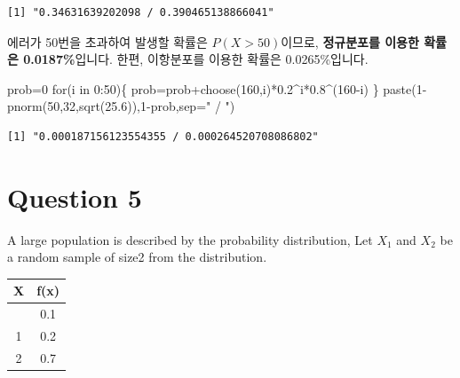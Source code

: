 \documentclass[
  a4paper,
  DIV=11,
  numbers=noendperiod]{scrreprt}
\newenvironment{Shaded}{\begin{snugshade}}{\end{snugshade}}
\newcommand{\AttributeTok}[1]{\textcolor[rgb]{0.40,0.45,0.13}{#1}}
\newcommand{\ControlFlowTok}[1]{\textcolor[rgb]{0.00,0.23,0.31}{#1}}
\newcommand{\DecValTok}[1]{\textcolor[rgb]{0.68,0.00,0.00}{#1}}
\newcommand{\FloatTok}[1]{\textcolor[rgb]{0.68,0.00,0.00}{#1}}
\newcommand{\FunctionTok}[1]{\textcolor[rgb]{0.28,0.35,0.67}{#1}}
\newcommand{\NormalTok}[1]{\textcolor[rgb]{0.00,0.23,0.31}{#1}}
\newcommand{\OtherTok}[1]{\textcolor[rgb]{0.00,0.23,0.31}{#1}}
\newcommand{\SpecialCharTok}[1]{\textcolor[rgb]{0.37,0.37,0.37}{#1}}
\newcommand{\StringTok}[1]{\textcolor[rgb]{0.13,0.47,0.30}{#1}}
\begin{document}
\begin{verbatim}
[1] "0.34631639202098 / 0.390465138866041"
\end{verbatim}

에러가 50번을 초과하여 발생할 확률은 \(P(X>50)\)이므로,
\textbf{정규분포를 이용한 확률은 0.0187\%}입니다. 한편, 이항분포를
이용한 확률은 0.0265\%입니다.

\begin{Shaded}
\begin{Highlighting}[]
\NormalTok{prob}\OtherTok{=}\DecValTok{0}
\ControlFlowTok{for}\NormalTok{(i }\ControlFlowTok{in} \DecValTok{0}\SpecialCharTok{:}\DecValTok{50}\NormalTok{)\{}
\NormalTok{    prob}\OtherTok{=}\NormalTok{prob}\SpecialCharTok{+}\FunctionTok{choose}\NormalTok{(}\DecValTok{160}\NormalTok{,i)}\SpecialCharTok{*}\FloatTok{0.2}\SpecialCharTok{\^{}}\NormalTok{i}\SpecialCharTok{*}\FloatTok{0.8}\SpecialCharTok{\^{}}\NormalTok{(}\DecValTok{160}\SpecialCharTok{{-}}\NormalTok{i)}
\NormalTok{\}}
\FunctionTok{paste}\NormalTok{(}\DecValTok{1}\SpecialCharTok{{-}}\FunctionTok{pnorm}\NormalTok{(}\DecValTok{50}\NormalTok{,}\DecValTok{32}\NormalTok{,}\FunctionTok{sqrt}\NormalTok{(}\FloatTok{25.6}\NormalTok{)),}\DecValTok{1}\SpecialCharTok{{-}}\NormalTok{prob,}\AttributeTok{sep=}\StringTok{" / "}\NormalTok{)}
\end{Highlighting}
\end{Shaded}

\begin{verbatim}
[1] "0.000187156123554355 / 0.000264520708086802"
\end{verbatim}

\section*{Question 5}\label{question-5-2}


A large population is described by the probability distribution, Let
\(X_1\) and \(X_2\) be a random sample of size2 from the distribution.

\begin{longtable}[]{@{}cc@{}}
\toprule\noalign{}
X & f(x) \\
\midrule\noalign{}
\endhead
\bottomrule\noalign{}
\endlastfoot
0 & 0.1 \\
1 & 0.2 \\
2 & 0.7 \\
\end{longtable}
\end{document}
